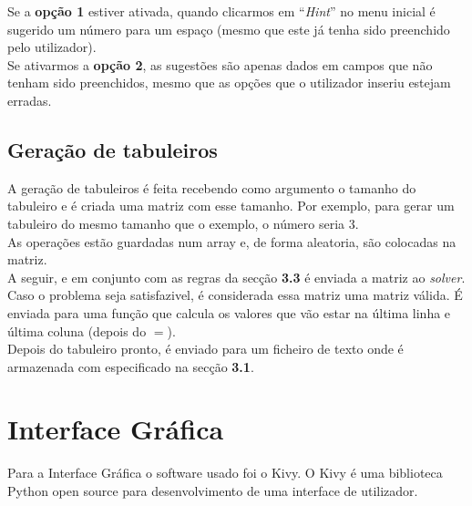 \documentclass{article}
\begin{document}
Se a {\bf{opção 1}} estiver ativada, quando clicarmos em ``{\it{Hint}}'' no menu inicial é sugerido um número para um espaço (mesmo que este já tenha sido preenchido pelo utilizador).
\\

Se ativarmos a {\bf{opção 2}}, as sugestões são apenas dados em campos que não tenham sido preenchidos, mesmo que as opções que o utilizador inseriu estejam erradas. 


\subsection{Geração de tabuleiros}

A geração de tabuleiros é feita recebendo como argumento o tamanho do tabuleiro e é criada uma matriz com esse tamanho. Por exemplo, para gerar um tabuleiro do mesmo tamanho que o exemplo, o número seria 3.
\\

As operações estão guardadas num array e, de forma aleatoria, são colocadas na matriz. 
\\

A seguir, e em conjunto com as regras da secção {\bf{3.3}} é enviada a matriz ao {\it{solver}}. Caso o problema seja satisfazivel, é considerada essa matriz uma matriz válida. É enviada para uma função que calcula os valores que vão estar na última linha e última coluna (depois do $=$). 
\\

Depois do tabuleiro pronto, é enviado para um ficheiro de texto onde é armazenada com especificado na secção {\bf{3.1}}.

\section{Interface Gráfica}

Para a Interface Gráfica o software usado foi o Kivy. O Kivy é uma biblioteca Python open source para desenvolvimento de uma interface de utilizador. 
\end{document}
